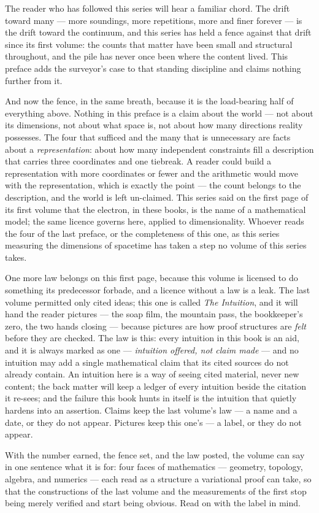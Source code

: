 The reader who has followed this series will hear a familiar chord. The
drift toward many --- more soundings, more repetitions, more and finer
forever --- is the drift toward the continuum, and this series has held a
fence against that drift since its first volume: the counts that matter
have been small and structural throughout, and the pile has never once
been where the content lived. This preface adds the surveyor's case to
that standing discipline and claims nothing further from it.

\begin{fence}
And now the fence, in the same breath, because it is the load-bearing half
of everything above. Nothing in this preface is a claim about the world
--- not about its dimensions, not about what space is, not about how many
directions reality possesses. The four that sufficed and the many that is
unnecessary are facts about a \emph{representation}: about how many
independent constraints fill a description that carries three coordinates
and one tiebreak. A reader could build a representation with more
coordinates or fewer and the arithmetic would move with the
representation, which is exactly the point --- the count belongs to the
description, and the world is left un-claimed. This series said on the
first page of its first volume that the electron, in these books, is the
name of a mathematical model; the same licence governs here, applied to
dimensionality. Whoever reads the four of the last preface, or the
completeness of this one, as this series measuring the dimensions of
spacetime has taken a step no volume of this series takes.
\end{fence}

One more law belongs on this first page, because this volume is licensed
to do something its predecessor forbade, and a licence without a law is a
leak. The last volume permitted only cited ideas; this one is called
\emph{The Intuition}, and it will hand the reader pictures --- the soap
film, the mountain pass, the bookkeeper's zero, the two hands closing ---
because pictures are how proof structures are \emph{felt} before they are
checked. The law is this: every intuition in this book is an aid, and it
is always marked as one --- \emph{intuition offered, not claim made} ---
and no intuition may add a single mathematical claim that its cited
sources do not already contain. An intuition here is a way of seeing cited
material, never new content; the back matter will keep a ledger of every
intuition beside the citation it re-sees; and the failure this book hunts
in itself is the intuition that quietly hardens into an assertion. Claims
keep the last volume's law --- a name and a date, or they do not appear.
Pictures keep this one's --- a label, or they do not appear.

With the number earned, the fence set, and the law posted, the volume can
say in one sentence what it is for: four faces of mathematics ---
geometry, topology, algebra, and numerics --- each read as a structure a
variational proof can take, so that the constructions of the last volume
and the measurements of the first stop being merely verified and start
being obvious. Read on with the label in mind.
